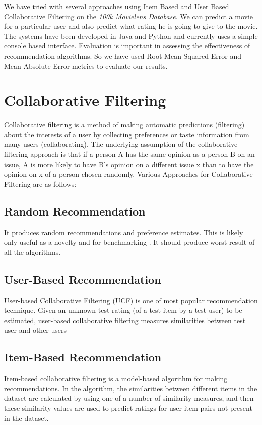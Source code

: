 \documentclass{article}
\begin{document}
We have tried with several approaches using Item Based and User Based Collaborative Filtering on the \emph{100k Movielens Database}. We can predict a movie for a particular user and also predict what rating he is going to give to the movie. The systems have been developed in Java and Python and currently uses a simple console based interface. Evaluation is important in assessing the effectiveness of recommendation algorithms. So we have used Root Mean Squared Error and Mean Absolute Error metrics to evaluate our results.

\section{Collaborative Filtering}
Collaborative filtering is a method of making automatic predictions (filtering) about the interests of a user by collecting preferences or taste information from many users (collaborating). The underlying assumption of the collaborative filtering approach is that if a person A has the same opinion as a person B on an issue, A is more likely to have B's opinion on a different issue x than to have the opinion on x of a person chosen randomly.
Various Approaches for Collaborative Filtering are as follows:
\subsection{Random Recommendation}
It produces random recommendations and preference estimates. This is likely only useful as a novelty and for benchmarking . It should produce worst result of all the algorithms.

\subsection{User-Based Recommendation}
User-based Collaborative Filtering (UCF) is one of most popular recommendation technique. Given an unknown test rating (of a test item by a test user) to be estimated, user-based collaborative filtering measures similarities between test user and other users

\subsection{Item-Based Recommendation}
Item-based collaborative filtering is a model-based algorithm for making recommendations. In the algorithm, the similarities between different items in the dataset are calculated by using one of a number of similarity measures, and then these similarity values are used to predict ratings for user-item pairs not present in the dataset.
\end{document}
